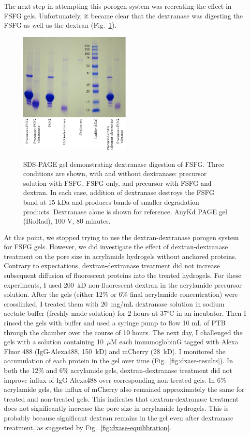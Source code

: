 The next step in attempting this porogen system was recreating the effect in FSFG gels.  Unfortunately, it became clear that the dextranase was digesting the FSFG as well as the dextran (Fig.~\ref{fig:dxase-FSFG}).  
\begin{figure} %
\caption[Dextranase degradation of FSFG.]{SDS-PAGE gel demonstrating dextranase digestion of FSFG.  Three conditions are shown, with and without dextranase: precursor solution with FSFG, FSFG only, and precursor with FSFG and dextran.  In each case, addition of dextranase destroys the FSFG band at 15 kDa and produces bands of smaller degradation products.  Dextranase alone is shown for reference.  AnyKd PAGE gel (BioRad), 100 V, 80 minutes.\\}
\centering
\includegraphics[width=0.5\textwidth]{figs/ch03/FSFG+dxase_PAGE}
\label{fig:dxase-FSFG}
\end{figure}
 At this point, we stopped trying to use the dextran-dextranase porogen system for FSFG gels.  However, we did investigate the effect of dextran-dextranase treatment on the pore size in acrylamide hydrogels without anchored proteins.  Contrary to expectations, dextran-dextranase treatment did not increase subsequent diffusion of fluorescent proteins into the treated hydrogels.  For these experiments, I used 200~kD non-fluorescent dextran in the acrylamide precursor solution.  After the gels (either 12\% or 6\% final acrylamide concentration) were crosslinked, I treated them with 20~mg/mL dextranase solution in sodium acetate buffer (freshly made solution) for 2 hours at 37$^\circ$C in an incubator.  Then I rinsed the gels with buffer and used a syringe pump to flow 10 mL of PTB through the chamber over the course of 10 hours. The next day, I challenged the gels with a solution containing 10~$\mu$M each immunoglobinG tagged with Alexa Fluor 488 (IgG-Alexa488, 150~kD) and mCherry (28~kD).  I monitored the accumulation of each protein in the gel over time (Fig.~\ref{fig:dxase-results}).  In both the 12\% and 6\% acrylamide gels, dextran-dextranase treatment did not improve influx of IgG-Alexa488 over corresponding non-treated gels.  In 6\% acrylamide gels, the influx of mCherry also remained approximately the same for treated and non-treated gels.  This indicates that dextran-dextranase treatment does not significantly increase the pore size in acrylamide hydrogels.  This is probably because significant dextran remains in the gel even after dextranase treatment, as suggested by Fig.~\ref{fig:dxase-equilibration}.
